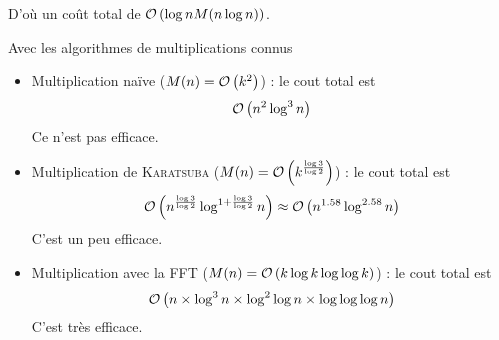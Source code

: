 D'où un coût total de $\mathcal O \left( \log n M(n\log n) \right)$.

Avec les algorithmes de multiplications connus
\begin{itemize}
    \item Multiplication naïve ($M(n) = \mathcal O \left( k^2 \right)$) : le cout total est 
        \[
            \mathcal O \left( n^2 \log^3 n \right)
        \]
        Ce n'est pas efficace.
    \item Multiplication de \textsc{Karatsuba} ($M(n) = \mathcal O \left( k^{\frac{\log 3}{\log 2}} \right)$) : le cout total est 
        \[
            \mathcal O \left( n^{\frac{\log 3}{\log 2}} \log^{1+{\frac{\log 3}{\log 2}}} n \right) \approx \mathcal O \left( n^{1.58} \log^{2.58} n \right)
        \]
        C'est un peu efficace.
    \item Multiplication avec la FFT ($M(n) = \mathcal O \left( k\log k \log \log k \right)$) : le cout total est 
        \[
            \mathcal O \left( n\times \log^3 n\times\log^2 \log n \times \log \log \log n \right)
        \]
        C'est très efficace.
\end{itemize}



